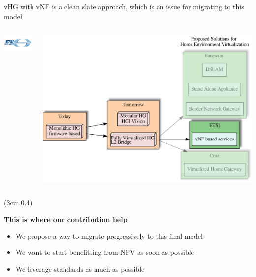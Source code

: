 \documentclass[a4paper]{beamer}
\begin{document}
\begin{frame}{vHG with vNF is a clean slate approach, which is an issue for migrating to this model}
		\begin{columns}[T]
		\begin{column}[T]{0.33 \textwidth} 
									\vspace{6em}
			\includegraphics[width=10em]{etsinfv.png}
		\end{column}
						
		\begin{column}[T]{0.66\textwidth} 
				   
				\includegraphics[width=\textwidth]{vhgtrends-etsi-emphasis.pdf}
																																
		\end{column}
																						
	\end{columns}
	\begin{textblock*}{8cm}(3cm,0.4\textheight)
		\begin{block}{}
			\textbf{ This is where our contribution help }
			\begin{itemize}
				\item We propose a way to migrate progressively to this final model
				\item We want to start benefitting from NFV as soon as possible
				\item We leverage standards as much as possible
			\end{itemize}
		\end{block}
	\end{textblock*}		
\end{frame}
\end{document}
